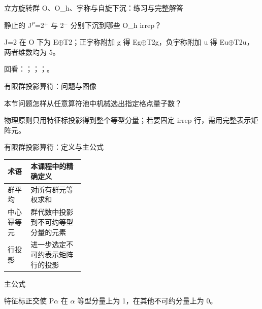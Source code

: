\begin{frame}[t]{立方旋转群 O、O\_h、宇称与自旋下沉：练习与完整解答}
\footnotesize
\begin{block}{}静止的 J\ensuremath{^{P}}=2\ensuremath{^{+}} 与 2\ensuremath{^{-}} 分别下沉到哪些 O\_h irrep？\end{block}
\begin{exampleblock}{}J=2 在 O 下为 E\ensuremath{\oplus}T2；正宇称附加 g 得 Eg\ensuremath{\oplus}T2g，负宇称附加 u 得 Eu\ensuremath{\oplus}T2u，两者维数均为 5。\end{exampleblock}
\vfill
\scriptsize 回看：；；；。
\end{frame}

\begin{frame}[t]{有限群投影算符：问题与图像}
\footnotesize
\begin{block}{本节问题}怎样从任意算符池中机械选出指定格点量子数？\end{block}
\begin{block}{物理原则}\quad 只用特征标投影得到整个等型分量；若要固定 irrep 行，需用完整表示矩阵元。\end{block}
\end{frame}

\begin{frame}[t]{有限群投影算符：定义与主公式}
\footnotesize\begin{tabularx}{\linewidth}{p{0.30\linewidth}Y}
\toprule 术语 & 本课程中的精确定义\\\midrule
{} 群平均 & 对所有群元等权求和\\
 中心幂等元 & 群代数中投影到不可约等型分量的元素\\
 行投影 & 进一步选定不可约表示矩阵行的投影\\
\bottomrule\end{tabularx}\vspace{0.15cm}
\begin{block}{ 主公式}\centering{}\end{block}
特征标正交使 P\ensuremath{\alpha} 在 \ensuremath{\alpha} 等型分量上为 1，在其他不可约分量上为 0。
\end{frame}

